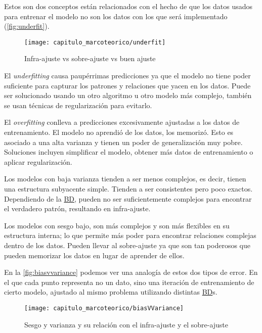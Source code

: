 Estos son dos conceptos están relacionados con el hecho de que los datos usados
para entrenar el modelo no son los datos con los que será implementado
(\autoref{fig:underfit}). 

\begin{figure}[H]
    \centering
    \texttt{[image: capitulo\_marcoteorico/underfit]}
    \caption{Infra-ajuste vs sobre-ajuste vs buen ajuste}\label{fig:underfit}
\end{figure}


El \emph{underfitting} causa paupérrimas predicciones ya que el modelo no tiene
poder suficiente para capturar los patrones y relaciones que yacen en los datos.
Puede ser solucionado usando un otro algoritmo u otro modelo más complejo,
también se usan técnicas de regularización para evitarlo.

El \emph{overfitting} conlleva a predicciones excesivamente ajustadas a los
datos de entrenamiento. El modelo no aprendió de los datos, los memorizó. Esto
es asociado a una alta varianza y tienen un poder de generalización muy pobre.
Soluciones incluyen simplificar el modelo, obtener más datos de entrenamiento o
aplicar regularización.

Los modelos con baja varianza tienden a ser menos complejos, es decir, tienen
una estructura subyacente simple. Tienden a ser consistentes pero poco exactos.
Dependiendo de la \hyperlink{abbr}{BD}, pueden no ser suficientemente complejos
para encontrar el verdadero patrón, resultando en infra-ajuste.

Los modelos con sesgo bajo, son más complejos y son más flexibles en su
estructura interna; lo que permite más poder para encontrar relaciones complejas
dentro de los datos. Pueden llevar al sobre-ajuste ya que son tan poderosos que
pueden memorizar los datos en lugar de aprender de ellos. 

En la \autoref{fig:biasvvariance} podemos ver una analogía de estos dos tipos de
error. En el que cada punto representa no un dato, sino una iteración de
entrenamiento de cierto modelo, ajustado al mismo problema utilizando distintas
\hyperlink{abbr}{BD}s.

\begin{figure}[H]
    \centering
    \texttt{[image: capitulo\_marcoteorico/biasVVariance]}
    \caption{Sesgo y varianza y su relación con el infra-ajuste y el sobre-ajuste}\label{fig:biasvvariance}
\end{figure}


